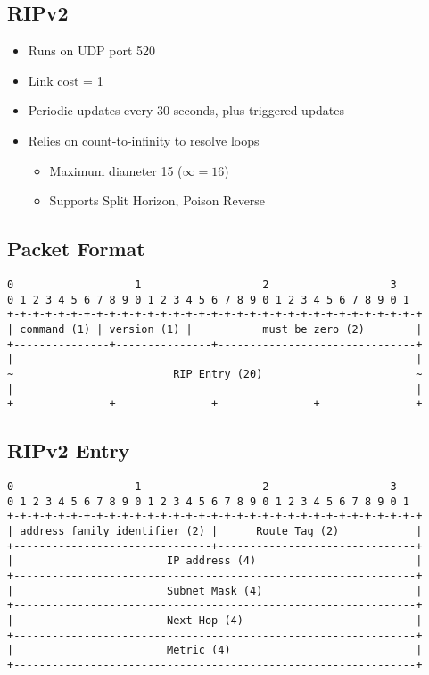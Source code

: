 \subsection{RIPv2}
\begin{itemize}[nosep]
    \item Runs on UDP port 520
    \item Link cost = 1
    \item Periodic updates every 30 seconds, plus triggered updates
    \item Relies on count-to-infinity to resolve loops
          \begin{itemize}[nosep]
              \item Maximum diameter 15 ($\infty = 16$)
              \item Supports Split Horizon, Poison Reverse
          \end{itemize}
\end{itemize}
\subsection{Packet Format}
\begin{verbatim}
0                   1                   2                   3
0 1 2 3 4 5 6 7 8 9 0 1 2 3 4 5 6 7 8 9 0 1 2 3 4 5 6 7 8 9 0 1
+-+-+-+-+-+-+-+-+-+-+-+-+-+-+-+-+-+-+-+-+-+-+-+-+-+-+-+-+-+-+-+-+
| command (1) | version (1) |           must be zero (2)        |
+---------------+---------------+-------------------------------+
|                                                               |
~                         RIP Entry (20)                        ~
|                                                               |
+---------------+---------------+---------------+---------------+
\end{verbatim}
\subsection{RIPv2 Entry}
\begin{verbatim}
0                   1                   2                   3
0 1 2 3 4 5 6 7 8 9 0 1 2 3 4 5 6 7 8 9 0 1 2 3 4 5 6 7 8 9 0 1
+-+-+-+-+-+-+-+-+-+-+-+-+-+-+-+-+-+-+-+-+-+-+-+-+-+-+-+-+-+-+-+-+
| address family identifier (2) |      Route Tag (2)            |
+-------------------------------+-------------------------------+
|                        IP address (4)                         |
+---------------------------------------------------------------+
|                        Subnet Mask (4)                        |
+---------------------------------------------------------------+
|                        Next Hop (4)                           |
+---------------------------------------------------------------+
|                        Metric (4)                             |
+---------------------------------------------------------------+
\end{verbatim}

